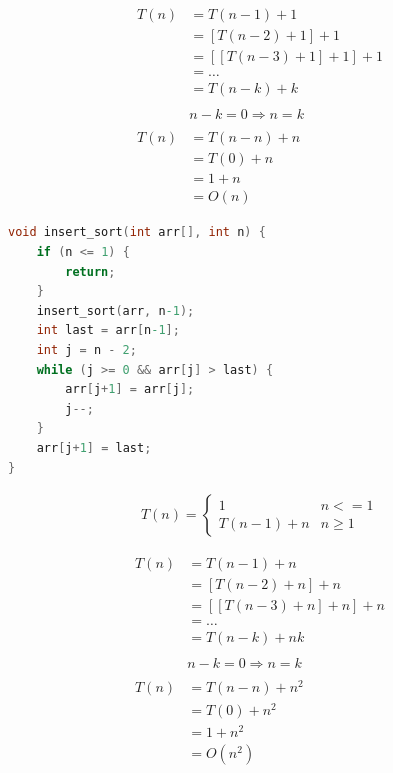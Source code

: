 \begin{align*}
	T(n) & = T(n-1) + 1                \\
	     & = [T(n-2) + 1] + 1          \\
	     & = [[T(n-3) + 1] + 1] + 1    \\
	     & = \dots                     \\
	     & = T(n-k) + k                \\
	\\
	     & n - k = 0 \Rightarrow n = k \\
	\\
	T(n) & = T(n-n) + n                \\
	     & = T(0) + n                  \\
	     & = 1 + n                     \\
	     & = O(n)
\end{align*}

\vspace{0.5cm}


\begin{lstlisting}[language=C]
void insert_sort(int arr[], int n) {
    if (n <= 1) {
		return;
	}
    insert_sort(arr, n-1);
    int last = arr[n-1];
    int j = n - 2;
    while (j >= 0 && arr[j] > last) {
        arr[j+1] = arr[j];
        j--;
    }
    arr[j+1] = last;
}
\end{lstlisting}

\vspace{-0.5cm}

\begin{align}
	T(n) = \begin{cases}
		1          & n <= 1  \\
		T(n-1) + n & n \ge 1
	\end{cases}
\end{align}

\vspace{-1cm}

\begin{align*}
	T(n) & = T(n-1) + n                \\
	     & = [T(n-2) + n] + n          \\
	     & = [[T(n-3) + n] + n] + n    \\
	     & = \dots                     \\
	     & = T(n-k) + nk               \\
	\\
	     & n - k = 0 \Rightarrow n = k \\
	\\
	T(n) & = T(n-n) + n^2              \\
	     & = T(0) + n^2                \\
	     & = 1 + n^2                   \\
	     & = O(n^2)
\end{align*}


